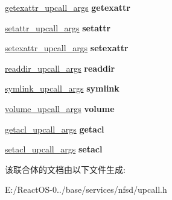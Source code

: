 \begin{DoxyCompactItemize}
\hyperlink{struct____getexattr__upcall__args}{getexattr\+\_\+upcall\+\_\+args} {\bfseries getexattr}
\item 
\mbox{\label{union____upcall__args_af072d19fcb0feefc5b05bfe45c11fc1a}} 
\hyperlink{struct____setattr__upcall__args}{setattr\+\_\+upcall\+\_\+args} {\bfseries setattr}
\item 
\mbox{\label{union____upcall__args_ab2ef3554a0ac04d83644dfdd66c74597}} 
\hyperlink{struct____setexattr__upcall__args}{setexattr\+\_\+upcall\+\_\+args} {\bfseries setexattr}
\item 
\mbox{\label{union____upcall__args_ad03d170e86e04b321596fcf157c347d6}} 
\hyperlink{struct____readdir__upcall__args}{readdir\+\_\+upcall\+\_\+args} {\bfseries readdir}
\item 
\mbox{\label{union____upcall__args_af351e404a73c554a909ebcf59c2cc4f6}} 
\hyperlink{struct____symlink__upcall__args}{symlink\+\_\+upcall\+\_\+args} {\bfseries symlink}
\item 
\mbox{\label{union____upcall__args_adce4567171b3c4b414e65986333e7a36}} 
\hyperlink{struct____volume__upcall__args}{volume\+\_\+upcall\+\_\+args} {\bfseries volume}
\item 
\mbox{\label{union____upcall__args_a2042d3f69d6646e22285845f30e44825}} 
\hyperlink{struct____getacl__upcall__args}{getacl\+\_\+upcall\+\_\+args} {\bfseries getacl}
\item 
\mbox{\label{union____upcall__args_a60e715aae725d9c8ef9d7eafcc4bdf28}} 
\hyperlink{struct____setacl__upcall__args}{setacl\+\_\+upcall\+\_\+args} {\bfseries setacl}
\end{DoxyCompactItemize}


该联合体的文档由以下文件生成\+:\begin{DoxyCompactItemize}
\item 
E\+:/\+React\+O\+S-\/0../base/services/nfsd/upcall.\+h\end{DoxyCompactItemize}
